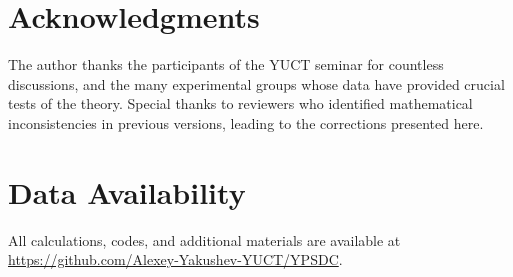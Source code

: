 \documentclass[12pt,a4paper]{article}
\theoremstyle{remark}
\begin{document}
	\section*{Acknowledgments}
	
	The author thanks the participants of the YUCT seminar for countless discussions, and the many experimental groups whose data have provided crucial tests of the theory. Special thanks to reviewers who identified mathematical inconsistencies in previous versions, leading to the corrections presented here.
	
	\section*{Data Availability}
	
	All calculations, codes, and additional materials are available at \url{https://github.com/Alexey-Yakushev-YUCT/YPSDC}.
	
\end{document}
